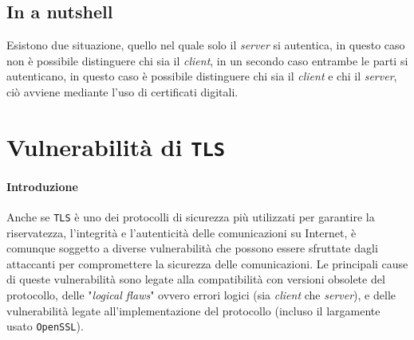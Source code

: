     \subsection{In a nutshell}
        Esistono due situazione, quello nel quale solo il \textit{server} si autentica, in questo caso non è possibile distinguere chi sia il \textit{client}, in un secondo caso entrambe le parti si autenticano, in questo caso è possibile distinguere chi sia il \textit{client} e chi il \textit{server}, ciò avviene mediante l'uso di certificati digitali. 
\section{Vulnerabilità di \texttt{TLS}}
    \paragraph{Introduzione} Anche se \texttt{TLS} è uno dei protocolli di sicurezza più utilizzati per garantire la riservatezza, l'integrità e l'autenticità delle comunicazioni su Internet, è comunque soggetto a diverse vulnerabilità che possono essere sfruttate dagli attaccanti per compromettere la sicurezza delle comunicazioni. Le principali cause di queste vulnerabilità sono legate alla compatibilità con versioni obsolete del protocollo, delle "\textit{logical flaws}" ovvero errori logici (sia \textit{client} che \textit{server}), e delle vulnerabilità legate all'implementazione del protocollo (incluso il largamente usato \texttt{OpenSSL}).
